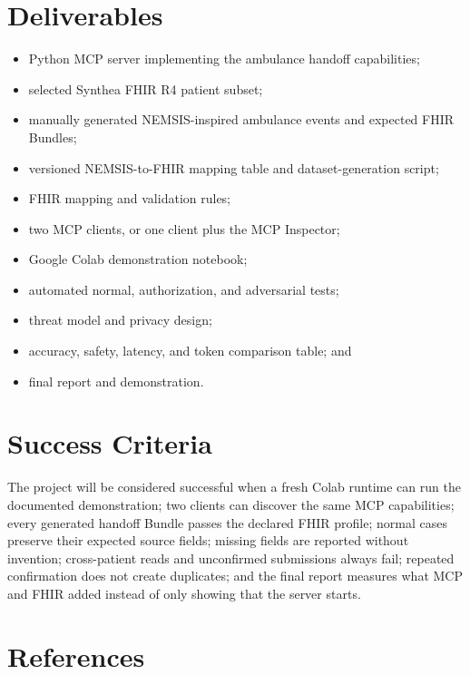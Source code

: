 \documentclass[10pt]{article}
\begin{document}
\section{Deliverables}

\begin{itemize}
  \item Python MCP server implementing the ambulance handoff capabilities;
  \item selected Synthea FHIR R4 patient subset;
  \item manually generated NEMSIS-inspired ambulance events and expected FHIR Bundles;
  \item versioned NEMSIS-to-FHIR mapping table and dataset-generation script;
  \item FHIR mapping and validation rules;
  \item two MCP clients, or one client plus the MCP Inspector;
  \item Google Colab demonstration notebook;
  \item automated normal, authorization, and adversarial tests;
  \item threat model and privacy design;
  \item accuracy, safety, latency, and token comparison table; and
  \item final report and demonstration.
\end{itemize}

\section{Success Criteria}

The project will be considered successful when a fresh Colab runtime can run the documented demonstration; two clients can discover the same MCP capabilities; every generated handoff Bundle passes the declared FHIR profile; normal cases preserve their expected source fields; missing fields are reported without invention; cross-patient reads and unconfirmed submissions always fail; repeated confirmation does not create duplicates; and the final report measures what MCP and FHIR added instead of only showing that the server starts.

\section{References}
\end{document}
